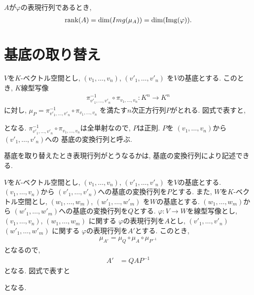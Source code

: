 \begin{prop}
  $A$が$\varphi$の表現行列であるとき,
  \begin{align*}
    \operatorname{rank}(A)=\dim(Img(\mu_A))=\dim(\operatorname{Img}(\varphi)).
  \end{align*}
\end{prop}

\section{基底の取り替え}
$V$を$K$-ベクトル空間とし,
$(v_1,\ldots,v_n)$,
$(v'_1,\ldots,v'_n)$
を$V$の基底とする.
このとき, $K$線型写像
\begin{align*}
\pi_{v'_1,\ldots,v'_n}^{-1}\circ \pi_{v_1,\ldots,v_n}\colon K^n\to K^n
\end{align*}
に対し,
$\mu_{P}=\pi_{v'_1,\ldots,v'_n}^{-1}\circ \pi_{v_1,\ldots,v_n}$
を満たす$n$次正方行列$P$がとれる.
図式で表すと,
\begin{center}
\end{center}
となる.
$\pi_{v'_1,\ldots,v'_n}^{-1}\circ \pi_{v_1,\ldots,v_n}$は全単射なので,
$P$は正則.
$P$を
$(v_1,\ldots,v_n)$から
$(v'_1,\ldots,v'_n)$への
基底の変換行列と呼ぶ.


基底を取り替えたとき表現行列がとうなるかは,
基底の変換行列により記述できる.
\begin{prop}
$V$を$K$-ベクトル空間とし,
$(v_1,\ldots,v_n)$,
$(v'_1,\ldots,v'_n)$
を$V$の基底とする.
$(v_1,\ldots,v_n)$から
$(v'_1,\ldots,v'_n)$への基底の変換行列を$P$とする.
また,
$W$を$K$-ベクトル空間とし,
$(w_1,\ldots,w_m)$,
$(w'_1,\ldots,w'_m)$
を$W$の基底とする.
$(w_1,\ldots,w_m)$から
$(w'_1,\ldots,w'_m)$への基底の変換行列を$Q$とする.
$\varphi\colon V\to W$を線型写像とし,
$(v_1,\ldots,v_n)$,
$(w_1,\ldots,w_m)$
に関する
$\varphi$の表現行列を$A$とし,
$(v'_1,\ldots,v'_n)$
$(w'_1,\ldots,w'_m)$
に関する
$\varphi$の表現行列を$A'$とする.
このとき,
\begin{align*}
\mu_{A'}=\mu_Q\circ \mu_A \circ \mu_{P^{-1}}
\end{align*}
となるので,
\begin{align*}
  A'&=Q A P^{-1}
\end{align*}
となる.
図式で表すと
\begin{center}
\end{center}
となる.
\end{prop}

